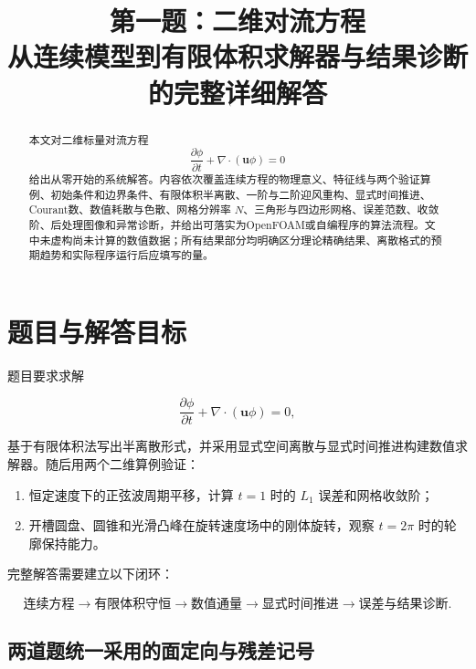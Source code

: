 \documentclass[UTF8,12pt,a4paper,fontset=fandol]{ctexart}
\title{\bfseries 第一题：二维对流方程\\从连续模型到有限体积求解器与结果诊断的完整详细解答}
\author{}
\date{}
\numberwithin{equation}{section}
\begin{document}
\maketitle
\vspace{-2.2em}

\begin{abstract}
本文对二维标量对流方程
\[
  \frac{\partial\phi}{\partial t}+\nabla\cdot(\bm u\phi)=0
\]
给出从零开始的系统解答。内容依次覆盖连续方程的物理意义、特征线与两个验证算例、初始条件和边界条件、有限体积半离散、一阶与二阶迎风重构、显式时间推进、Courant数、数值耗散与色散、网格分辨率 $N$、三角形与四边形网格、误差范数、收敛阶、后处理图像和异常诊断，并给出可落实为OpenFOAM或自编程序的算法流程。文中未虚构尚未计算的数值数据；所有结果部分均明确区分理论精确结果、离散格式的预期趋势和实际程序运行后应填写的量。
\end{abstract}

\tableofcontents
\newpage

\section{题目与解答目标}

题目要求求解

\begin{equation}
  \frac{\partial\phi}{\partial t}
  +\nabla\cdot(\bm u\phi)=0,
  \label{eq:governing}
\end{equation}

基于有限体积法写出半离散形式，并采用显式空间离散与显式时间推进构建数值求解器。随后用两个二维算例验证：

\begin{enumerate}
  \item 恒定速度下的正弦波周期平移，计算 $t=1$ 时的 $L_1$ 误差和网格收敛阶；
  \item 开槽圆盘、圆锥和光滑凸峰在旋转速度场中的刚体旋转，观察 $t=2\pi$ 时的轮廓保持能力。
\end{enumerate}

完整解答需要建立以下闭环：

\begin{equation}
\boxed{
\text{连续方程}
\rightarrow
\text{有限体积守恒}
\rightarrow
\text{数值通量}
\rightarrow
\text{显式时间推进}
\rightarrow
\text{误差与结果诊断}
}.
\end{equation}

\subsection{两道题统一采用的面定向与残差记号}
\end{document}
